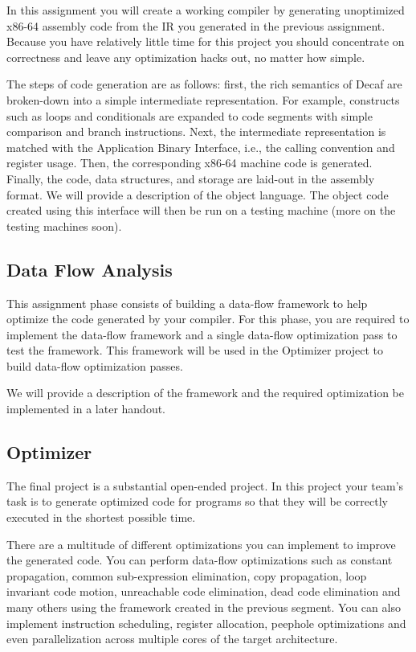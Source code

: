\documentclass[11pt]{article}
\begin{document}
In this assignment you will create a working compiler by generating unoptimized x86-64 assembly code from the IR you generated in the previous assignment.
Because you have relatively little time for this project you should concentrate on correctness and leave any optimization hacks out, no matter how simple.

The steps of code generation are as follows:
first, the rich semantics of Decaf are broken-down into a simple intermediate representation.
For example, constructs such as loops and conditionals are expanded to code segments with simple comparison and branch instructions.
Next, the intermediate representation is matched with the Application Binary Interface, i.e., the calling convention and register usage.
Then, the corresponding x86-64 machine code is generated.
Finally, the code, data structures, and storage are laid-out in the assembly format.
We will provide a description of the object language.
The object code created using this interface will then be run on a testing machine (more on the testing machines soon).

\subsection{Data Flow Analysis}

This assignment phase consists of building a data-flow framework to help optimize the code generated by your compiler.
For this phase, you are required to implement the data-flow framework and a single data-flow optimization pass to test the framework.
This framework will be used in the Optimizer project to build data-flow optimization passes.

We will provide a description of the framework and the required optimization be implemented in a later handout.

\subsection{Optimizer}

The final project is a substantial open-ended project.
In this project your team's task is to generate optimized code for programs so that they will be correctly executed in the shortest possible time.

There are a multitude of different optimizations you can implement to improve the generated code.
You can perform data-flow optimizations such as constant propagation, common sub-expression elimination, copy propagation, loop invariant code motion, unreachable code elimination, dead code elimination and many others using the framework created in the previous segment.
You can also implement instruction scheduling, register allocation, peephole optimizations and even parallelization across multiple cores of the target architecture.
\end{document}
